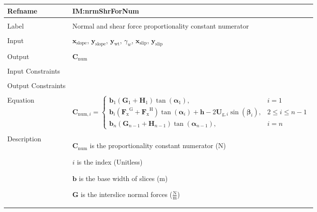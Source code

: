 \documentclass[12pt]{article}
\begin{document}
\noindent \begin{minipage}{\textwidth}
\begin{tabular}{>{\raggedright}p{}>{\raggedright\arraybackslash}p{}}
\toprule \textbf{Refname} & \textbf{IM:nrmShrForNum}
\label{IM:nrmShrForNum}
\\ \midrule \\
Label & Normal and shear force proportionality constant numerator
\\ \midrule \\
Input & ${\mathbf{x}_{\text{slope}}}$, ${\mathbf{y}_{\text{slope}}}$, ${\mathbf{y}_{\text{wt}}}$, ${γ_{w}}$, ${\mathbf{x}_{\text{slip}}}$, ${\mathbf{y}_{\text{slip}}}$
\\ \midrule \\
Output & ${\mathbf{C}_{\text{num}}}$
\\ \midrule \\
Input Constraints & 
\\ \midrule \\
Output Constraints & 
\\ \midrule \\
Equation & \begin{displaymath}
           {\mathbf{C}_{\text{num},i}}=\begin{cases}
                                       {\mathbf{b}}_{1} \left({\mathbf{G}}_{1}+{\mathbf{H}}_{1}\right) \tan\left({\mathbf{α}}_{1}\right), & i=1\\
{\mathbf{b}}_{i} \left({{\mathbf{F}_{\text{x}}}^{\text{G}}}+{{\mathbf{F}_{\text{x}}}^{\text{H}}}\right) \tan\left({\mathbf{α}}_{i}\right)+\mathbf{h} -2 {\mathbf{U}_{\text{g},i}} \sin\left({\mathbf{β}}_{i}\right), & 2\leq{}i\leq{}n-1\\
{\mathbf{b}}_{n} \left({\mathbf{G}}_{n-1}+{\mathbf{H}}_{n-1}\right) \tan\left({\mathbf{α}}_{n-1}\right), & i=n
                                       \end{cases}
           \end{displaymath}
\\ \midrule \\
Description & \begin{symbDescription}
              \item{${\mathbf{C}_{\text{num}}}$ is the proportionality constant numerator (N)}
              \item{$i$ is the index (Unitless)}
              \item{$\mathbf{b}$ is the base width of slices (m)}
              \item{$\mathbf{G}$ is the interslice normal forces ($\frac{\text{N}}{\text{m}}$)}

\end{symbDescription}
\end{tabular}
\end{minipage}
\end{document}
